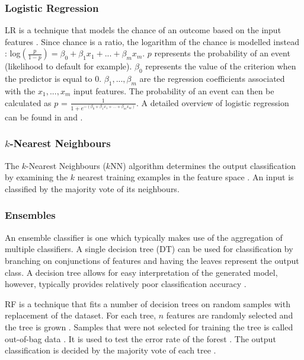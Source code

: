 \documentclass{sig-alternate-05-2015}
\begin{document}
	\subsubsection{Logistic Regression}
	LR is a technique that models the chance of an outcome based on the input features \cite{doi:10.11613/BM.2014.003}. Since chance is a ratio, the logarithm of the chance is modelled instead \cite{doi:10.11613/BM.2014.003}:
	log$(\frac{p}{1 - p}) = \beta_0 + \beta_1 x_1 + ... + \beta_m x_m$. $p$ represents the probability of an event (likelihood to default for example). $\beta_0$ represents the value of the criterion when the predictor is equal to 0. $\beta_1, ..., \beta_m$ are the regression coefficients associated with the $x_1, ..., x_m$ input features. The probability of an event can then be calculated as $p$ = $\frac{1}{1 + e^{-(\beta_0 + \beta_1 x_1 + ... + \beta_m x_m)}}$. A detailed overview of logistic regression can be found in \cite{Mood01022010} and \cite{doi:10.11613/BM.2014.003}.
	
	\subsubsection{$k$-Nearest Neighbours}
	The $k$-Nearest Neighbours ($k$NN) algorithm determines the output classification by examining the $k$ nearest training examples in the feature space \cite{6313426}. An input is classified by the majority vote of its neighbours.
	
	\subsubsection{Ensembles}
	An ensemble classifier is one which typically makes use of the aggregation of multiple classifiers. A single decision tree (DT) can be used for classification by branching on conjunctions of features and having the leaves represent the output class. A decision tree allows for easy interpretation of the generated model, however, typically provides relatively poor classification accuracy \cite{doi:10.1021/ci034160g}. 
	
	RF is a technique that fits a number of decision trees on random samples with replacement of the dataset. For each tree, $n$ features are randomly selected and the tree is grown \cite{WIDM:WIDM1072}. Samples that were not selected for training the tree is called out-of-bag data \cite{WIDM:WIDM1072}. It is used to test the error rate of the forest \cite{WIDM:WIDM1072, doi:10.1021/ci034160g}. The output classification is decided by the majority vote of each tree \cite{WIDM:WIDM1072}.
	
\end{document}
